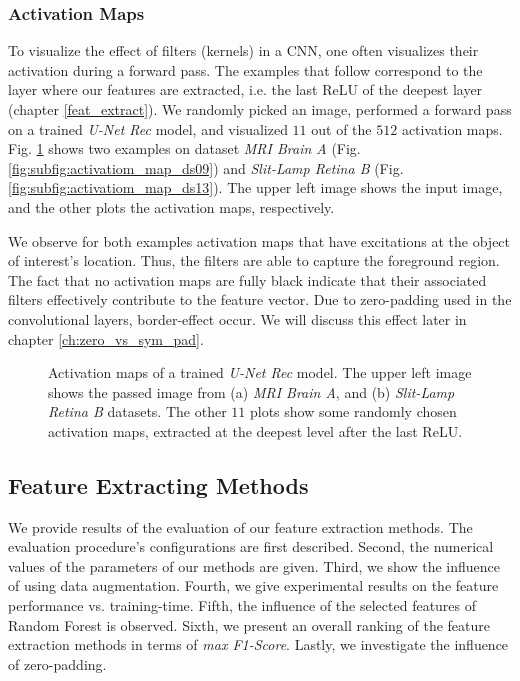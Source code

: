 \clearpage
\subsubsection{Activation Maps} \label{ch:act_maps}
To visualize the effect of filters (kernels) in a CNN, one often visualizes their activation during a forward pass.
The examples that follow correspond to the layer where our features are extracted, i.e. the last ReLU of the deepest layer (chapter \ref{feat_extract}). We randomly picked an image, performed a forward pass on a trained \textit{U-Net Rec} model, and visualized $11$ out of the $512$ activation maps. Fig. \ref{fig:activatiom_maps} shows two examples on dataset \textit{MRI Brain A} (Fig. \ref{fig:subfig:activatiom_map_ds09}) and \textit{Slit-Lamp Retina B} (Fig. \ref{fig:subfig:activatiom_map_ds13}). The upper left image shows the input image, and the other plots the activation maps, respectively.

We observe for both examples activation maps that have excitations at the object of interest's location. Thus, the filters are able to capture the foreground region. The fact that no activation maps are fully black indicate that their associated filters effectively contribute to the feature vector. Due to zero-padding used in the convolutional layers, border-effect occur. We will discuss this effect later in chapter \ref{ch:zero_vs_sym_pad}.
\vspace{30pt}

\begin{figure}[!htbp]
  \centering
  \hfill
  \caption[Activation maps]{Activation maps of a trained \textit{U-Net Rec} model. The upper left image shows the passed image from (a) \textit{MRI Brain A}, and (b) \textit{Slit-Lamp Retina B} datasets. The other $11$ plots show some randomly chosen activation maps, extracted at the deepest level after the last ReLU.}
  \label{fig:activatiom_maps}
\end{figure}

\clearpage
\subsection{Feature Extracting Methods}
We provide results of the evaluation of our feature extraction methods. The evaluation procedure's configurations are first described. Second, the numerical values of the parameters of our methods are given. Third, we show the influence of using data augmentation. Fourth, we give experimental results on the feature performance vs. training-time. Fifth, the influence of the selected features of Random Forest is observed. Sixth, we present an overall ranking of the feature extraction methods in terms of \textit{max F1-Score}. Lastly, we investigate the influence of zero-padding.

